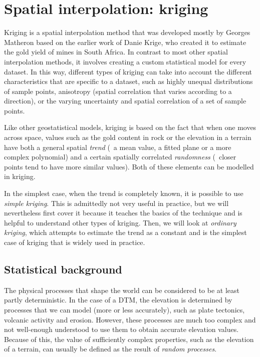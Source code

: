 
\setchapterpreamble[u]{\margintoc}

\graphicspath{{kriging/}}

\chapter{Spatial interpolation: kriging}%
\label{chap:kriging}


Kriging is a spatial interpolation method that was developed mostly by Georges Matheron based on the earlier work of Danie Krige, who created it to estimate the gold yield of mines in South Africa.
In contrast to most other spatial interpolation methods, it involves creating a custom statistical model for every dataset.
In this way, different types of kriging can take into account the different characteristics that are specific to a dataset, such as highly unequal distributions of sample points, anisotropy (spatial correlation that varies according to a direction), or the varying uncertainty and spatial correlation of a set of sample points.

Like other geostatistical models, kriging is based on the fact that when one moves across space, values such as the gold content in rock or the elevation in a terrain have both a general spatial \emph{trend} (\eg\ a mean value, a fitted plane or a more complex polynomial) and a certain spatially correlated \emph{randomness} (\ie\ closer points tend to have more similar values).
Both of these elements can be modelled in kriging.

In the simplest case, when the trend is completely known, it is possible to use \emph{simple kriging}.
This is admittedly not very useful in practice, but we will nevertheless first cover it because it teaches the basics of the technique and is helpful to understand other types of kriging.
Then, we will look at \emph{ordinary kriging}, which attempts to estimate the trend as a constant and is the simplest case of kriging that is widely used in practice.

\section{Statistical background}

The physical processes that shape the world can be considered to be at least partly deterministic.
In the case of a DTM, the elevation is determined by processes that we can model (more or less accurately), such as plate tectonics, volcanic activity and erosion.
However, these processes are much too complex and not well-enough understood to use them to obtain accurate elevation values.
Because of this, the value of sufficiently complex properties, such as the elevation of a terrain, can usually be defined as the result of \emph{random processes}.

